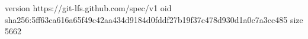 version https://git-lfs.github.com/spec/v1
oid sha256:5ff63ca616a65f49c42aa434d9184d0fddf27b19f37c478d930d1a0c7a3cc485
size 5662
